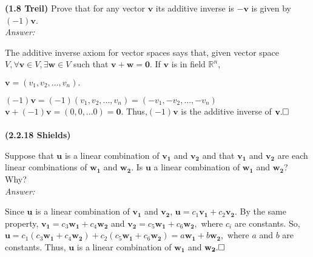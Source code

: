 \documentclass{book}
\renewcommand{\vec}[1]{\mathbf{#1}}
\begin{document}
	
	\noindent\textbf{(1.8 Treil)}
	Prove that for any vector $\vec{v}$ its additive inverse is $-\vec{v}$ is given by $(-1)\vec{v}$.
	\\\textit{Answer:}
	
	The additive inverse axiom for vector spaces says that, given vector space $V,\forall \vec{v} \in V, \exists \vec{w} \in V$ such that $\vec{v}+\vec{w}=\vec{0}.$
	If $\vec{v}$ is in field $\mathbb{R}^n$,
	
	$\vec{v}=(v_1,v_2,...,v_n).$
	  
	$(-1)\vec{v}=(-1)(v_1,v_2,...,v_n)=(-v_1,-v_2,...,-v_n)$
	$\vec{v}+(-1)\vec{v}=(0,0,...0)=\vec{0}$.
	Thus,$(-1)\vec{v}$ is the additive inverse of $\vec{v}.\\
	\square$\\\\
	
	\noindent\textbf{(2.2.18 Shields)}
	
	Suppose that $\vec{u}$ is a linear combination of $\vec{v_1}$ and $\vec{v_2}$ and that $\vec{v_1}$ and $\vec{v_2}$ are each linear combinations of $\vec{w_1}$ and $\vec{w_2}$.  Is $\vec{u}$ a linear combination of $\vec{w_1}$ and $\vec{w_2}$?  Why?
	\\\textit{Answer:}
	
	Since $\vec{u}$ is a linear combination of $\vec{v_1}$ and $\vec{v_2}$, $\vec{u}=c_1\vec{v_1}+c_2\vec{v_2}.$  By the same property, $\vec{v_1}=c_3\vec{w_1}+c_4\vec{w_2}$ and $\vec{v_2}=c_5\vec{w_1}+c_6\vec{w_2},$  where $c_i$ are constants.  So, $\vec{u}=c_1(c_3\vec{w_1}+c_4\vec{w_2})+c_2(c_5\vec{w_1}+c_6\vec{w_2})=a\vec{w_1}+b\vec{w_2},$ where $a$ and $b$ are constants.  Thus, $\vec{u}$ is a linear combination of $\vec{w_1}$ and $\vec{w_2}.\\
	\square$\\\\
	
\end{document}
